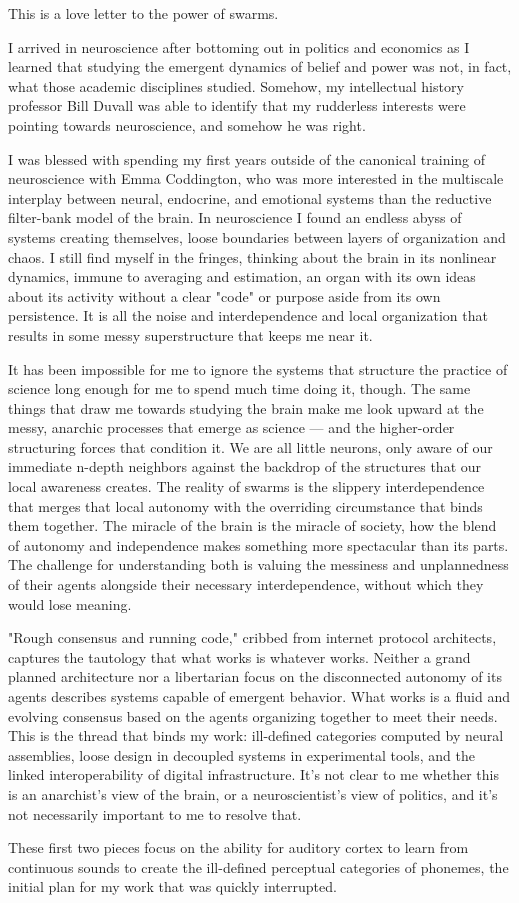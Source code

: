 
This is a love letter to the power of swarms.

I arrived in neuroscience after bottoming out in politics and economics as I learned that studying the emergent dynamics of belief and power was not, in fact, what those academic disciplines studied. Somehow, my intellectual history professor Bill Duvall was able to identify that my rudderless interests were pointing towards neuroscience, and somehow he was right.

I was blessed with spending my first years outside of the canonical training of neuroscience with Emma Coddington, who was more interested in the multiscale interplay between neural, endocrine, and emotional systems than the reductive filter-bank model of the brain. In neuroscience I found an endless abyss of systems creating themselves, loose boundaries between layers of organization and chaos. I still find myself in the fringes, thinking about the brain in its nonlinear dynamics, immune to averaging and estimation, an organ with its own ideas about its activity without a clear "code" or purpose aside from its own persistence. It is all the noise and interdependence and local organization that results in some messy superstructure that keeps me near it.

It has been impossible for me to ignore the systems that structure the practice of science long enough for me to spend much time doing it, though. The same things that draw me towards studying the brain make me look upward at the messy, anarchic processes that emerge as science --- and the higher-order structuring forces that condition it. We are all little neurons, only aware of our immediate n-depth neighbors against the backdrop of the structures that our local awareness creates. The reality of swarms is the slippery interdependence that merges that local autonomy with the overriding circumstance that binds them together. The miracle of the brain is the miracle of society, how the blend of autonomy and independence makes something more spectacular than its parts. The challenge for understanding both is valuing the messiness and unplannedness of their agents alongside their necessary interdependence, without which they would lose meaning.

"Rough consensus and running code," cribbed from internet protocol architects\citep{clarkCloudyCrystalBall1992}, captures the tautology that what works is whatever works. Neither a grand planned architecture nor a libertarian focus on the disconnected autonomy of its agents describes systems capable of emergent behavior. What works is a fluid and evolving consensus based on the agents organizing together to meet their needs. This is the thread that binds my work: ill-defined categories computed by neural assemblies, loose design in decoupled systems in experimental tools, and the linked interoperability of digital infrastructure.  It's not clear to me whether this is an anarchist's view of the brain, or a neuroscientist's view of politics, and it's not necessarily important to me to resolve that.

These first two pieces focus on the ability for auditory cortex to learn from continuous sounds to create the ill-defined perceptual categories of phonemes, the initial plan for my work that was quickly interrupted.



